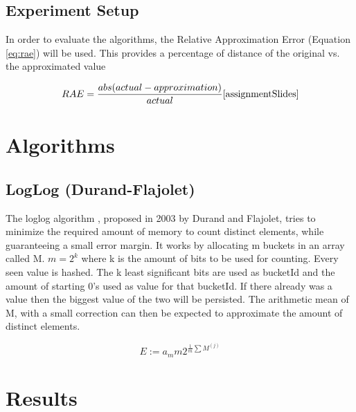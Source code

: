 \documentclass{article}[]
\begin{document}
\subsection{Experiment Setup}
\label{sec:setup}
In order to evaluate the algorithms, the Relative Approximation Error (Equation \ref{eq:rae}) will be used. This provides a percentage of distance of the original vs. the approximated value

\begin{equation}
\label{eq:rae}
RAE = \frac{abs(actual - approximation)}{ actual}
\cite{assignmentSlides}
\end{equation}
\section{Algorithms}
\label{sec:algorithms}
\subsection{LogLog (Durand-Flajolet)}
The loglog algorithm \cite{durand2003loglog}, proposed in 2003 by Durand and Flajolet, tries to minimize the required amount of memory to count distinct elements, while guaranteeing a small error margin.
It works by allocating m buckets in an array called M.
$m=2^k$ where k is the amount of bits to be used for counting.
Every seen value is hashed.
The k least significant bits are used as bucketId and the amount of starting 0's used as value for that bucketId. If there already was a value then the biggest value of the two will be persisted.
The arithmetic mean of M, with a small correction can then be expected to approximate the amount of distinct elements.

\begin{equation}
\label{eq:loglog}
E := a_m m 2^{\frac{1}{m}\sum M^{(j)}}
\end{equation}

\section{Results}
\label{sec:result}


 

	
	
\end{document}
